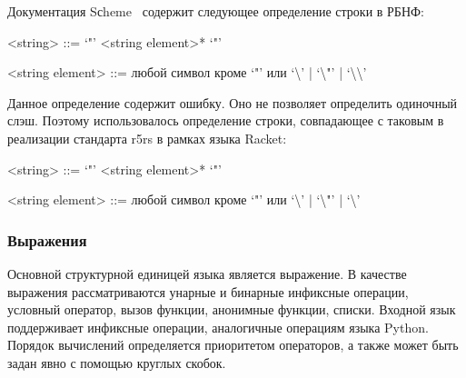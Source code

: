 \documentclass[12pt,a4paper,oneside]{extarticle}
\begin{document}
            Документация Sсheme~\cite{r5rs} содержит следующее определение строки в РБНФ:
            \begin{grammar}
                <string> ::= `"' <string element>* `"'

                <string element> ::= любой символ кроме `"' или `\textbackslash' | `\textbackslash "' | `\textbackslash \textbackslash'
            \end{grammar}
            Данное определение содержит ошибку.
            Оно не позволяет определить одиночный слэш.
            Поэтому использовалось определение строки, совпадающее с таковым в реализации стандарта r5rs в рамках языка Racket: 
            \begin{grammar}
                <string> ::= `"' <string element>* `"'

                <string element> ::= любой символ кроме `"' или `\textbackslash' | `\textbackslash "' | `\textbackslash'
            \end{grammar}

        \subsubsection{Выражения}
            Основной структурной единицей языка является выражение.
            В качестве выражения рассматриваются унарные и бинарные инфиксные операции, условный оператор, вызов функции, анонимные функции, списки.
            Входной язык поддерживает инфиксные операции, аналогичные операциям языка Python.
            Порядок вычислений определяется приоритетом операторов, а также может быть задан явно с помощью круглых скобок.
\end{document}
